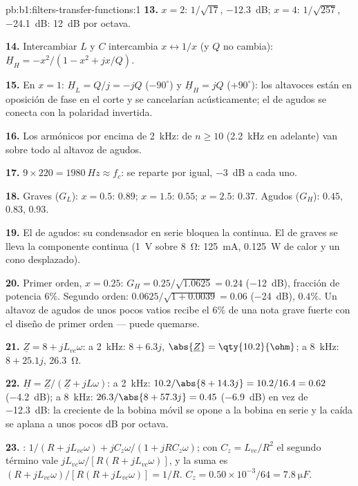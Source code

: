 \begin{solution}{pb:b1:filters-transfer-functions:1}
\textbf{13.} $x = 2$: $1/\sqrt{17}$, \qty{-12.3}{dB}; $x = 4$: $1/\sqrt{257}$,
\qty{-24.1}{dB}: \qty{12}{dB} por octava.

\textbf{14.} Intercambiar $L$ y $C$ intercambia $x \leftrightarrow 1/x$ (y
$Q$ no cambia): $\underline H_H = -x^2/(1 - x^2 + jx/Q)$.

\textbf{15.} En $x = 1$: $\underline H_L = Q/j = -jQ$ ($-90^\circ$) y
$\underline H_H = jQ$ ($+90^\circ$): los altavoces están en oposición de
fase en el corte y se cancelarían acústicamente; el de agudos se conecta
con la polaridad invertida.

\textbf{16.} Los armónicos por encima de \qty{2}{kHz}: de $n \geq 10$
(\qty{2.2}{kHz} en adelante) van sobre todo al altavoz de agudos.

\textbf{17.} $9 \times 220 = \qty{1980}{Hz} \approx f_c$: se reparte por
igual, \qty{-3}{dB} a cada uno.

\textbf{18.} Graves ($G_L$): $x = 0.5$: $0.89$; $x = 1.5$: $0.55$; $x = 2.5$:
$0.37$. Agudos ($G_H$): $0.45$, $0.83$, $0.93$.

\textbf{19.} El de agudos: su condensador en serie bloquea la continua. El
de graves se lleva la componente continua (\qty{1}{V} sobre
\qty{8}{\ohm}: \qty{125}{mA}, \qty{0.125}{W} de calor y un cono desplazado).

\textbf{20.} Primer orden, $x = 0.25$: $G_H = 0.25/\sqrt{1.0625} = 0.24$
(\qty{-12}{dB}), fracción de potencia $6\%$. Segundo orden: $0.0625/\sqrt{1 +
0.0039} = 0.06$ (\qty{-24}{dB}), $0.4\%$. Un altavoz de agudos de unos
pocos vatios recibe el $6\%$ de una nota grave fuerte con el diseño de
primer orden --- puede quemarse.

\textbf{21.} $\underline Z = 8 + jL_{vc}\omega$: a \qty{2}{kHz}: $8 + 6.3j$,
$\abs{\underline Z} = \qty{10.2}{\ohm}$; a \qty{8}{kHz}: $8 + 25.1j$,
\qty{26.3}{\ohm}.

\textbf{22.} $\underline H = \underline Z/(\underline Z + jL\omega)$: a
\qty{2}{kHz}: $10.2/\abs{8 + 14.3j} = 10.2/16.4 = 0.62$ (\qty{-4.2}{dB});
a \qty{8}{kHz}: $26.3/\abs{8 + 57.3j} = 0.45$ (\qty{-6.9}{dB}) en vez de
\qty{-12.3}{dB}: la  creciente de la bobina móvil se opone a la
bobina en serie y la caída se aplana a unos pocos dB por octava.

\textbf{23.} : $1/(R + jL_{vc}\omega) + jC_z\omega/(1 + jRC_z\omega)$;
con $C_z = L_{vc}/R^2$ el segundo término vale $jL_{vc}\omega/[R(R +
jL_{vc}\omega)]$, y la suma es $(R + jL_{vc}\omega)/[R(R + jL_{vc}\omega)]
= 1/R$. $C_z = 0.50\times10^{-3}/64 = \qty{7.8}{\micro F}$.


\end{solution}
